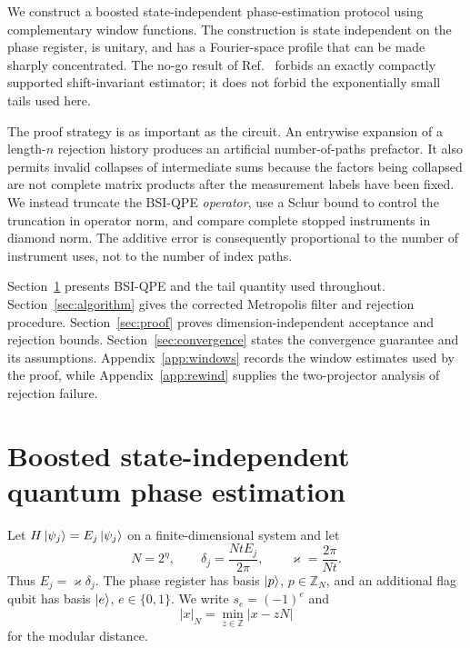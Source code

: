 \documentclass[aps,floatfix,10pt,amssymb,amsmath,superscriptaddress,nofootinbib,longbibliography,nobalancelastpage,twocolumn]{revtex4-2}
\begin{document}
We construct a boosted state-independent phase-estimation protocol using complementary window functions.  The construction is state independent on the phase register, is unitary, and has a Fourier-space profile that can be made sharply concentrated.  The no-go result of Ref.~\cite{chen2023quantumthermalstatepreparation} forbids an exactly compactly supported shift-invariant estimator; it does not forbid the exponentially small tails used here.

The proof strategy is as important as the circuit.  An entrywise expansion of a length-$n$ rejection history produces an artificial number-of-paths prefactor.  It also permits invalid collapses of intermediate sums because the factors being collapsed are not complete matrix products after the measurement labels have been fixed.  We instead truncate the BSI-QPE \emph{operator}, use a Schur bound to control the truncation in operator norm, and compare complete stopped instruments in diamond norm.  The additive error is consequently proportional to the number of instrument uses, not to the number of index paths.

Section~\ref{sec:bsi} presents BSI-QPE and the tail quantity used throughout.  Section~\ref{sec:algorithm} gives the corrected Metropolis filter and rejection procedure.  Section~\ref{sec:proof} proves dimension-independent acceptance and rejection bounds.  Section~\ref{sec:convergence} states the convergence guarantee and its assumptions.  Appendix~\ref{app:windows} records the window estimates used by the proof, while Appendix~\ref{app:rewind} supplies the two-projector analysis of rejection failure.

\section{Boosted state-independent quantum phase estimation}
\label{sec:bsi}

Let $H\ket{\psi_j}=E_j\ket{\psi_j}$ on a finite-dimensional system and let
\begin{equation}
    N=2^\eta,\qquad
    \delta_j=\frac{NtE_j}{2\pi},\qquad
    \varkappa=\frac{2\pi}{Nt}.
    \label{eq:scaled-energy}
\end{equation}
Thus $E_j=\varkappa\delta_j$.  The phase register has basis $\ket{p}$, $p\in\mathbb Z_N$, and an additional flag qubit has basis $\ket{e}$, $e\in\{0,1\}$.  We write $s_e=(-1)^e$ and
\begin{equation}
 |x|_N=\min_{z\in\mathbb Z}|x-zN|
 \label{eq:mod-distance}
\end{equation}
for the modular distance.
\end{document}
